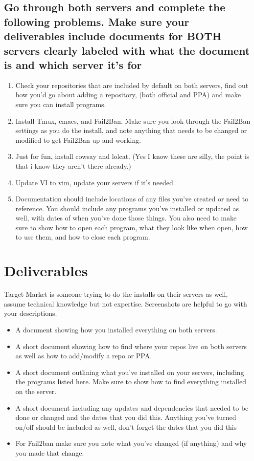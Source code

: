 \documentclass[12pt]{article}
\begin{document}
\subsection*{Go through both servers and complete the following problems.  Make sure your deliverables include documents for BOTH servers clearly labeled with what the document is and which server it's for}
    \begin{enumerate}
        \item Check your repositories that are included by default on both servers, find out how you'd go about adding a repository, (both official and PPA) and make sure you can install programs.
        \item Install Tmux, emacs, and Fail2Ban.  Make sure you look through the Fail2Ban settings as you do the install, and note anything that needs to be changed or modified to get Fail2Ban up and working.
        \item Just for fun, install cowsay and lolcat.   (Yes I know these are silly, the point is that i know they aren't there already.)
        \item Update VI to vim, update your servers if it's needed.
        \item Documentation should include locations of any files you've created or need to reference. You should include any programs you've installed or updated as well, with dates of when you've done those things. You also need to make sure to show how to open each program, what they look like when open, how to use them, and how to close each program.
    \end{enumerate}

\section*{Deliverables}
Target Market is someone trying to do the installs on their servers as well, assume technical knowledge but not expertise.  Screenshots are helpful to go with your descriptions. 

\begin{itemize}
    \item A document showing how you installed everything on both servers.
    \item A short document showing how to find where your repos live on both servers as well as how to add/modify a repo or PPA.
    \item A short document outlining what you've installed on your servers,  including the programs listed here. Make sure to show how to find everything installed on the server.
    \item A short document including any updates and dependencies that needed to be done or changed and the dates that you did this.  Anything you've turned on/off should be included as well, don't forget the dates that you did this
    \item For Fail2ban make sure you note what you've changed (if anything) and why you made that change.
\end{itemize}
\end{document}
